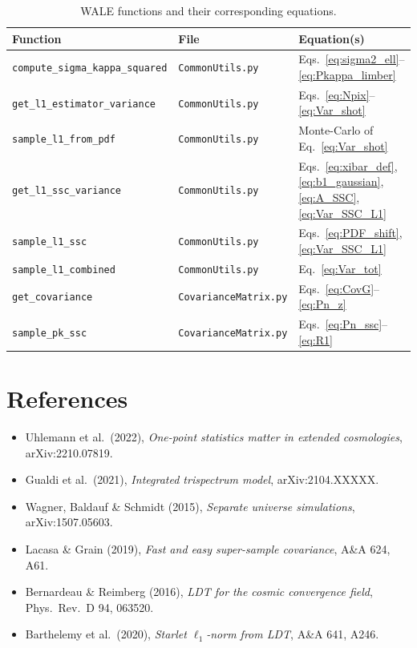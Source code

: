 \documentclass[12pt,a4paper]{article}
\begin{document}
\begin{table}[h]
\centering
\renewcommand{\arraystretch}{1.4}
\begin{tabular}{lll}
\toprule
Function & File & Equation(s) \\
\midrule
\texttt{compute\_sigma\_kappa\_squared} & \texttt{CommonUtils.py}
  & Eqs.~\eqref{eq:sigma2_ell}--\eqref{eq:Pkappa_limber} \\
\texttt{get\_l1\_estimator\_variance} & \texttt{CommonUtils.py}
  & Eqs.~\eqref{eq:Npix}--\eqref{eq:Var_shot} \\
\texttt{sample\_l1\_from\_pdf} & \texttt{CommonUtils.py}
  & Monte-Carlo of Eq.~\eqref{eq:Var_shot} \\
\texttt{get\_l1\_ssc\_variance} & \texttt{CommonUtils.py}
  & Eqs.~\eqref{eq:xibar_def}, \eqref{eq:b1_gaussian},
    \eqref{eq:A_SSC}, \eqref{eq:Var_SSC_L1} \\
\texttt{sample\_l1\_ssc} & \texttt{CommonUtils.py}
  & Eqs.~\eqref{eq:PDF_shift}, \eqref{eq:Var_SSC_L1} \\
\texttt{sample\_l1\_combined} & \texttt{CommonUtils.py}
  & Eq.~\eqref{eq:Var_tot} \\
\texttt{get\_covariance} & \texttt{CovarianceMatrix.py}
  & Eqs.~\eqref{eq:CovG}--\eqref{eq:Pn_z} \\
\texttt{sample\_pk\_ssc} & \texttt{CovarianceMatrix.py}
  & Eqs.~\eqref{eq:Pn_ssc}--\eqref{eq:R1} \\
\bottomrule
\end{tabular}
\caption{WALE functions and their corresponding equations.}
\label{tab:implementations}
\end{table}

\section*{References}

\begin{itemize}
  \item Uhlemann et al.~(2022), \textit{One-point statistics matter in
        extended cosmologies}, arXiv:2210.07819.
  \item Gualdi et al.~(2021), \textit{Integrated trispectrum model},
        arXiv:2104.XXXXX.
  \item Wagner, Baldauf \& Schmidt (2015), \textit{Separate universe
        simulations}, arXiv:1507.05603.
  \item Lacasa \& Grain (2019), \textit{Fast and easy super-sample
        covariance}, A\&A 624, A61.
  \item Bernardeau \& Reimberg (2016), \textit{LDT for the cosmic
        convergence field}, Phys.~Rev.~D 94, 063520.
  \item Barthelemy et al.~(2020), \textit{Starlet $\ell_1$-norm from LDT},
        A\&A 641, A246.
\end{itemize}
\end{document}
